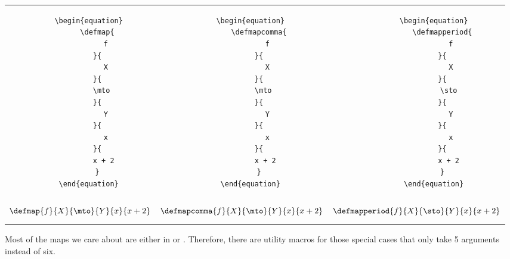\begin{widepar}
	\begin{tabular}{|c|c|c|}%
		\hline
		\begin{minipage}{0.3\textwidth}
			\begin{verbatim}
    \begin{equation}
        \defmap{
            f
        }{
            X
        }{
            \mto  
        }{
            Y
        }{
            x
        }{
            x + 2 
        }
    \end{equation}
    \end{verbatim}
		\end{minipage}
		 &
		\begin{minipage}{0.3\textwidth}
			\begin{verbatim}
    \begin{equation}
        \defmapcomma{
            f
        }{
            X
        }{
            \mto  
        }{
            Y
        }{
            x
        }{
            x + 2 
        }
    \end{equation}
    \end{verbatim}
		\end{minipage}
		 &
		\begin{minipage}{0.3\textwidth}
			\begin{verbatim}
        \begin{equation}
            \defmapperiod{
                f
            }{
                X
            }{
                \sto 
            }{
                Y
            }{
                x
            }{
                x + 2 
            }
        \end{equation}
        \end{verbatim}
		\end{minipage}
		\\
		\begin{minipage}{0.3\textwidth}
			\begin{equation*}
				\defmap{
					f
				}{
					X
				}{
					\mto
				}{
					Y
				}{
					x
				}{
					x + 2
				}
			\end{equation*}
		\end{minipage}
		 &
		\begin{minipage}{0.3\textwidth}
			\begin{equation*}
				\defmapcomma{
					f
				}{
					X
				}{
					\mto
				}{
					Y
				}{
					x
				}{
					x + 2
				}
			\end{equation*}
		\end{minipage}
		 &
		\begin{minipage}{0.3\textwidth}
			\begin{equation*}
				\defmapperiod{
					f
				}{
					X
				}{
					\sto
				}{
					Y
				}{
					x
				}{
					x + 2
				}
			\end{equation*}
		\end{minipage}
		\\\hline
	\end{tabular}
\end{widepar}
Most of the maps we care about are either in \Set or \Pos.
Therefore, there are utility macros for those special cases  that only take 5 arguments instead of six.

